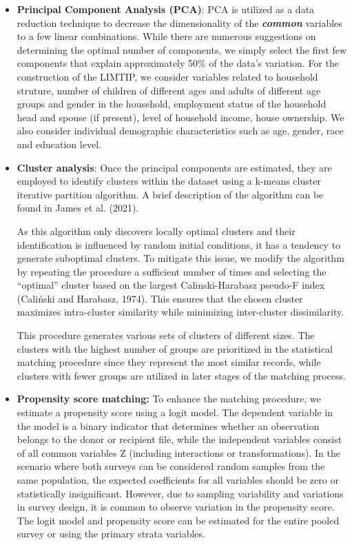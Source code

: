 \documentclass[
  11pt,
]{article}
\begin{document}
\begin{itemize}
\item
  \textbf{Principal Component Analysis (PCA)}: PCA is utilized as a data
  reduction technique to decrease the dimensionality of the
  \textbf{\emph{common}} variables to a few linear combinations. While
  there are numerous suggestions on determining the optimal number of
  components, we simply select the first few components that explain
  approximately 50\% of the data's variation. For the construction of
  the LIMTIP, we consider variables related to household struture,
  number of children of different ages and adults of different age
  groups and gender in the household, employment status of the household
  head and spouse (if present), level of household income, house
  ownership. We also consider individual demographic characteristics
  such as age, gender, race and education level.
\item
  \textbf{Cluster analysis}: Once the principal components are
  estimated, they are employed to identify clusters within the dataset
  using a k-means cluster iterative partition algorithm. A brief
  description of the algorithm can be found in James et al. (2021).

  As this algorithm only discovers locally optimal clusters and their
  identification is influenced by random initial conditions, it has a
  tendency to generate suboptimal clusters. To mitigate this issue, we
  modify the algorithm by repeating the procedure a sufficient number of
  times and selecting the ``optimal'' cluster based on the largest
  Calinski-Harabasz pseudo-F index (Caliński and Harabasz, 1974). This
  ensures that the chosen cluster maximizes intra-cluster similarity
  while minimizing inter-cluster dissimilarity.

  This procedure generates various sets of clusters of different sizes.
  The clusters with the highest number of groups are prioritized in the
  statistical matching procedure since they represent the most similar
  records, while clusters with fewer groups are utilized in later stages
  of the matching process.
\item
  \textbf{Propensity score matching:} To enhance the matching procedure,
  we estimate a propensity score using a logit model. The dependent
  variable in the model is a binary indicator that determines whether an
  observation belongs to the donor or recipient file, while the
  independent variables consist of all common variables Z (including
  interactions or transformations). In the scenario where both surveys
  can be considered random samples from the same population, the
  expected coefficients for all variables should be zero or
  statistically insignificant. However, due to sampling variability and
  variations in survey design, it is common to observe variation in the
  propensity score. The logit model and propensity score can be
  estimated for the entire pooled survey or using the primary strata
  variables.
\end{itemize}
\end{document}
